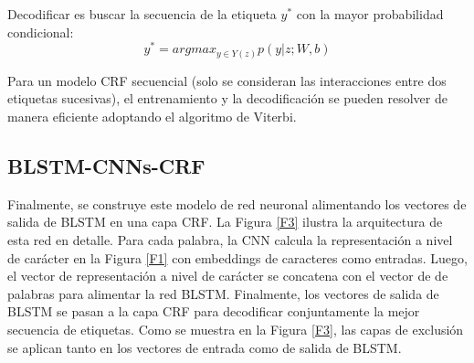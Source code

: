 \documentclass[runningheads]{llncs}
\begin{document}
Decodificar es buscar la secuencia de la etiqueta $y^*$ con la mayor probabilidad condicional:
\begin{equation}
	y^\ast = argmax_{y\in Y(z)} p(y|z; W, b)
\end{equation}


Para un modelo CRF secuencial (solo se consideran las interacciones entre dos etiquetas sucesivas),
el entrenamiento y la decodificación se pueden resolver de manera eficiente adoptando el algoritmo 
de Viterbi.

\subsection{BLSTM-CNNs-CRF}
	
Finalmente, se construye este modelo de red neuronal alimentando los vectores de salida de BLSTM 
en una capa CRF. La Figura \ref{F3} ilustra la arquitectura de esta red en detalle. Para cada palabra, 
la CNN calcula la representación a nivel de carácter en la Figura \ref{F1} con embeddings de caracteres 
como entradas. Luego, el vector de representación a nivel de carácter se concatena con el vector de 
de palabras para alimentar la red BLSTM. Finalmente, los vectores de salida de BLSTM se 
pasan a la capa CRF para decodificar conjuntamente la mejor secuencia de etiquetas. Como se 
muestra en la Figura \ref{F3}, las capas de exclusión se aplican tanto en los vectores de entrada como 
de salida de BLSTM.
\end{document}
